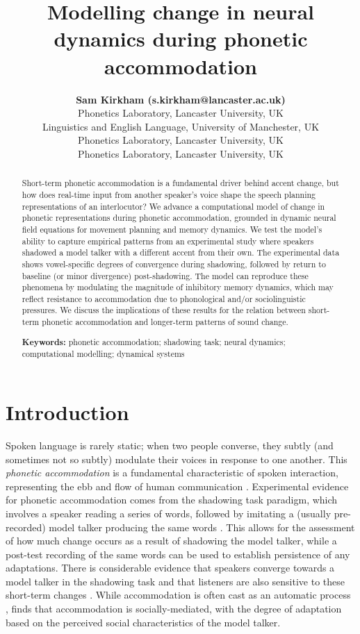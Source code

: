 \documentclass[10pt,letterpaper]{article}
\title{Modelling change in neural dynamics during phonetic accommodation}
\author{{\large \bf Sam Kirkham (s.kirkham@lancaster.ac.uk)} \\
  Phonetics Laboratory, Lancaster University, UK
  \AND {\large \bf Patrycja Strycharczuk (patrycja.strycharczuk@manchester.ac.uk)} \\
  Linguistics and English Language, University of Manchester, UK
  \AND {\large \bf Rob Davies (r.l.davies@lancaster.ac.uk)} \\
  Phonetics Laboratory, Lancaster University, UK
  \AND {\large \bf Danielle Welburn (dani\_welburn@hotmail.com)} \\
  Phonetics Laboratory, Lancaster University, UK
  }
\begin{document}
\maketitle


\begin{abstract}
Short-term phonetic accommodation is a fundamental driver behind accent change, but how does real-time input from another speaker's voice shape the speech planning representations of an interlocutor? We advance a computational model of change in phonetic representations during phonetic accommodation, grounded in dynamic neural field equations for movement planning and memory dynamics. We test the model's ability to capture empirical patterns from an experimental study where speakers shadowed a model talker with a different accent from their own. The experimental data shows vowel-specific degrees of convergence during shadowing, followed by return to baseline (or minor divergence) post-shadowing. The model can reproduce these phenomena by modulating the magnitude of inhibitory memory dynamics, which may reflect resistance to accommodation due to phonological and/or sociolinguistic pressures. We discuss the implications of these results for the relation between short-term phonetic accommodation and longer-term patterns of sound change.

\textbf{Keywords:} 
phonetic accommodation; shadowing task; neural dynamics; computational modelling; dynamical systems
\end{abstract}


\section{Introduction}

Spoken language is rarely static; when two people converse, they subtly (and sometimes not so subtly) modulate their voices in response to one another. This \textit{phonetic accommodation} is a fundamental characteristic of spoken interaction, representing the ebb and flow of human communication \citep{giles1973, pardo2006}. Experimental evidence for phonetic accommodation comes from the shadowing task paradigm, which involves a speaker reading a series of words, followed by imitating a (usually pre-recorded) model talker producing the same words \citep{goldinger1998}. This allows for the assessment of how much change occurs as a result of shadowing the model talker, while a post-test recording of the same words can be used to establish persistence of any adaptations. There is considerable evidence that speakers converge towards a model talker in the shadowing task and that listeners are also sensitive to these short-term changes \citep{goldinger1998, namy-etal2002, shockley-etal2004, tilsen2009b}. While accommodation is often cast as an automatic process \citep{goldinger1998}, \citet{babel2012} finds that accommodation is socially-mediated, with the degree of adaptation based on the perceived social characteristics of the model talker. 
\end{document}
